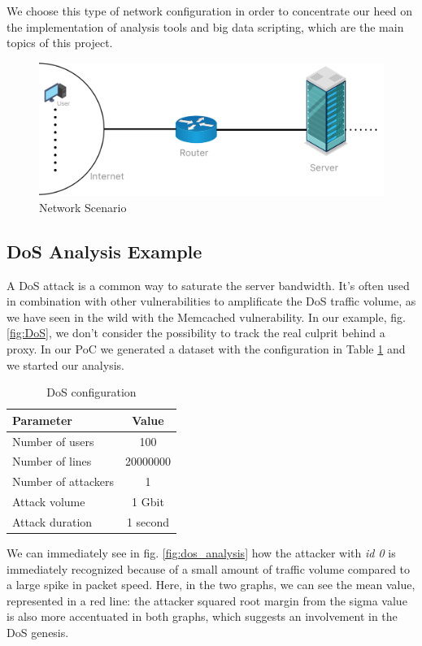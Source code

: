 We choose this type of network configuration in order to concentrate our heed on the implementation of analysis tools and big data scripting, which are the main topics of this project.
 
\begin{figure}[ht]
  \includegraphics[scale=0.31]{imgs/scenario.png}
  \caption{Network Scenario}
  \label{fig:networkscenario}
\end{figure} 
 
\subsection{DoS Analysis Example}
A DoS attack is a common way to saturate the server bandwidth. It's often used in combination with other vulnerabilities to amplificate the DoS traffic volume, as we have seen in the wild with the Memcached vulnerability\cite{memcached_vulnerability}. In our example, fig. \ref{fig:DoS}, we don't consider the possibility to track the real culprit behind a proxy.
In our PoC we generated a dataset with the configuration in Table \ref{tab:tab:dos_config} and we started our analysis.

\begin{table}[h]
\centering
\begin{tabular}{|l|c|}
\hline
\textbf{Parameter} & \textbf{Value} \\ \hline
 Number of users & 100 \\ 
 Number of lines & 20000000 \\ 
 Number of attackers & 1 \\ 
 Attack volume & 1 Gbit \\
 Attack duration & 1 second \\  
 \hline 
\end{tabular}
\caption{DoS configuration}
\label{tab:tab:dos_config}
\end{table}

We can immediately see in fig. \ref{fig:dos_analysis} how the attacker with \textit{id 0} is immediately recognized because of a small amount of traffic volume compared to a large spike in packet speed. Here, in the two graphs, we can see the mean value, represented in a red line: the attacker squared root margin from the sigma value is also more accentuated in both graphs, which suggests an involvement in the DoS genesis.

